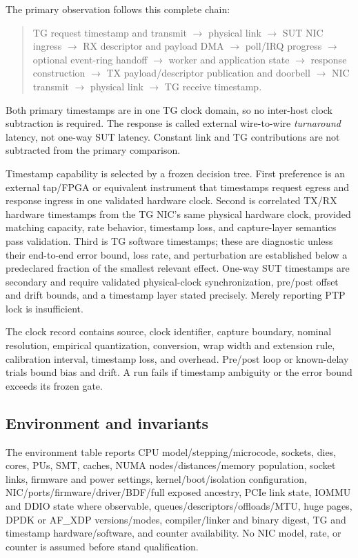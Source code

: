 The primary observation follows this complete chain:
\begin{quote}\small
TG request timestamp and transmit $\rightarrow$ physical link $\rightarrow$ SUT NIC ingress $\rightarrow$ RX descriptor and payload DMA $\rightarrow$ poll/IRQ progress $\rightarrow$ optional event-ring handoff $\rightarrow$ worker and application state $\rightarrow$ response construction $\rightarrow$ TX payload/descriptor publication and doorbell $\rightarrow$ NIC transmit $\rightarrow$ physical link $\rightarrow$ TG receive timestamp.
\end{quote}
Both primary timestamps are in one TG clock domain, so no inter-host clock subtraction is required. The response is called external wire-to-wire \emph{turnaround} latency, not one-way SUT latency. Constant link and TG contributions are not subtracted from the primary comparison.

Timestamp capability is selected by a frozen decision tree. First preference is an external tap/FPGA or equivalent instrument that timestamps request egress and response ingress in one validated hardware clock. Second is correlated TX/RX hardware timestamps from the TG NIC's same physical hardware clock, provided matching capacity, rate behavior, timestamp loss, and capture-layer semantics pass validation. Third is TG software timestamps; these are diagnostic unless their end-to-end error bound, loss rate, and perturbation are established below a predeclared fraction of the smallest relevant effect. One-way SUT timestamps are secondary and require validated physical-clock synchronization, pre/post offset and drift bounds, and a timestamp layer stated precisely. Merely reporting PTP lock is insufficient.

The clock record contains source, clock identifier, capture boundary, nominal resolution, empirical quantization, conversion, wrap width and extension rule, calibration interval, timestamp loss, and overhead. Pre/post loop or known-delay trials bound bias and drift. A run fails if timestamp ambiguity or the error bound exceeds its frozen gate.

\subsection{Environment and invariants}

The environment table reports CPU model/stepping/microcode, sockets, dies, cores, PUs, SMT, caches, NUMA nodes/distances/memory population, socket links, firmware and power settings, kernel/boot/isolation configuration, NIC/ports/firmware/driver/BDF/full exposed ancestry, PCIe link state, IOMMU and DDIO state where observable, queues/descriptors/offloads/MTU, huge pages, DPDK or AF\_XDP versions/modes, compiler/linker and binary digest, TG and timestamp hardware/software, and counter availability. No NIC model, rate, or counter is assumed before stand qualification.

